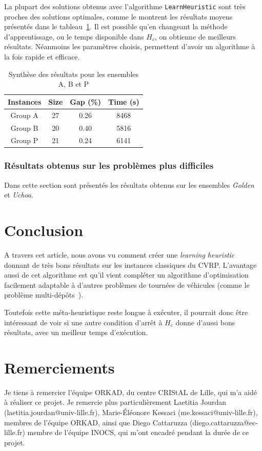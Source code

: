 \documentclass[a4paper,11pt]{article}%
\begin{document}
La plupart des solutions obtenus avec l'algorithme \lstinline|LearnHeuristic| sont très proches des solutions optimales, comme le montrent les résultats moyens présentés dans le tableau~\ref{Synth}. 
Il est possible qu'en changeant la méthode d'apprentissage, ou le temps disponible dans $H_c$, on obtienne de meilleurs résultats. Néanmoins les paramètres choisis, permettent d'avoir un algorithme à la fois rapide et efficace. 

\begin{table}[h!]
\caption{Synthèse des résultats pour les ensembles A, B et P}
\label{Synth}
\begin{center}
\begin{tabular}{|c|c|c|c|}

\hline
 Instances & Size & Gap (\%) & Time (s)  \\
 \hline
 Group A & 27 & 0.26 & 8468  \\
 \hline
 Group B & 20  & 0.40 & 5816   \\
  \hline
  Group P & 21 & 0.24 & 6141   \\
 \hline

\end{tabular}
\end{center}
\end{table}

\subsubsection{Résultats obtenus sur les problèmes plus difficiles}

Dans cette section sont présentés les résultats obtenus sur les ensembles \emph{Golden} et \emph{Uchoa}.

\section*{Conclusion}
A travers cet article, nous avons vu comment créer une \emph{learning heuristic} donnant de très bons résultats sur les instances classiques du CVRP.
L'avantage aussi de cet algorithme est qu'il vient compléter un algorithme d'optimisation facilement adaptable à d'autres problèmes de tournées de véhicules (comme le problème multi-dépôts~\cite{Sorensen_2017}).
 
Toutefois cette méta-heuristique reste longue à exécuter, il pourrait donc être intéressant de voir si une autre condition d'arrêt à $H_c$ donne d'aussi bons résultats, avec un meilleur temps d'exécution.


\section*{Remerciements}
Je tiens à remercier l'équipe ORKAD, du centre CRIStAL de Lille, qui m'a aidé à réaliser ce projet. Je remercie plus particulièrement Laetitia Jourdan (laetitia.jourdan@univ-lille.fr), Marie-Éléonore Kessaci (me.kessaci@univ-lille.fr), membres de l'équipe ORKAD, ainsi que Diego Cattaruzza (diego.cattaruzza@ec-lille.fr) membre de l'équipe INOCS, qui m'ont encadré pendant la durée de ce projet.





\end{document}
